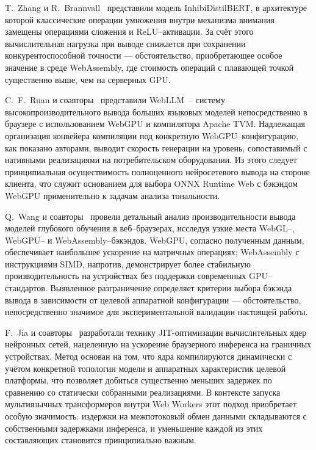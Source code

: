 T.~Zhang и R.~Brannvall~\cite{zhang2025inhibidistilbert} представили модель InhibiDistilBERT, в архитектуре которой классические операции умножения внутри механизма внимания замещены операциями сложения и ReLU–активации. За счёт этого вычислительная нагрузка при выводе снижается при сохранении конкурентоспособной точности — обстоятельство, приобретающее особое значение в среде WebAssembly, где стоимость операций с плавающей точкой существенно выше, чем на серверных GPU.

C.~F.~Ruan и соавторы~\cite{ruan2024webllm} представили WebLLM~– систему высокопроизводительного вывода больших языковых моделей непосредственно в браузере с использованием WebGPU и компилятора Apache TVM. Надлежащая организация конвейера компиляции под конкретную WebGPU–конфигурацию, как показано авторами, выводит скорость генерации на уровень, сопоставимый с нативными реализациями на потребительском оборудовании. Из этого следует принципиальная осуществимость полноценного нейросетевого вывода на стороне клиента, что служит основанием для выбора ONNX Runtime Web с бэкэндом WebGPU применительно к задачам анализа тональности.
 
Q.~Wang и соавторы~\cite{wang2024anatomizing} провели детальный анализ производительности вывода моделей глубокого обучения в веб–браузерах, исследуя узкие места WebGL–, WebGPU– и WebAssembly–бэкэндов. WebGPU, согласно полученным данным, обеспечивает наибольшее ускорение на матричных операциях; WebAssembly с инструкциями SIMD, напротив, демонстрирует более стабильную производительность на устройствах без поддержки современных GPU–стандартов. Выявленное разграничение определяет критерии выбора бэкэнда вывода в зависимости от целевой аппаратной конфигурации — обстоятельство, непосредственно значимое для экспериментальной валидации настоящей работы.
 
F.~Jia и соавторы~\cite{jia2024empowering} разработали технику JIT-оптимизации вычислительных ядер нейронных сетей, нацеленную на ускорение браузерного инференса на граничных устройствах. Метод основан на том, что ядра компилируются динамически с учётом конкретной топологии модели и аппаратных характеристик целевой платформы, что позволяет добиться существенно меньших задержек по сравнению со статически собранными реализациями. В контексте запуска мультиязычных трансформеров внутри Web Workers этот подход приобретает особую значимость: издержки на межпотоковый обмен данными складываются с собственными задержками инференса, и уменьшение каждой из этих составляющих становится принципиально важным.

